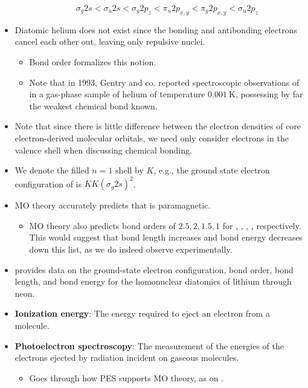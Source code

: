 \documentclass[../notes.tex]{subfiles}
\begin{document}
\begin{itemize}
\begin{itemize}
        \begin{equation*}
            \sigma_g2s < \sigma_u2s
            < \sigma_g2p_z
            < \pi_u2p_{x,y}
            < \pi_g2p_{x,y}
            < \sigma_u2p_z
        \end{equation*}
    \end{itemize}
    \item Diatomic helium does not exist since the bonding and antibonding electrons cancel each other out, leaving only repulsive nuclei.
    \begin{itemize}
        \item Bond order formalizes this notion.
        \item Note that in 1993, Gentry and co. reported spectroscopic observations of  in a gas-phase sample of helium of temperature $\SI{0.001}{\kelvin}$, possessing by far the weakest chemical bond known.
    \end{itemize}
    \item Note that since there is little difference between the electron densities of core electron-derived molecular orbitals, we need only consider electrons in the valence shell when discussing chemical bonding.
    \item We denote the filled $n=1$ shell by $K$, e.g., the ground state electron configuration of  is $KK(\sigma_g2s)^2$.
    \item MO theory accurately predicts that  is paramagnetic.
    \begin{itemize}
        \item MO theory also predicts bond orders of $2.5,2,1.5,1$ for , , , , respectively. This would suggest that bond length increases and bond energy decreases down this list, as we do indeed observe experimentally.
    \end{itemize}
    \item \textcite{bib:McQuarrieSimon} provides data on the ground-state electron configuration, bond order, bond length, and bond energy for the homonuclear diatomics of lithium through neon.
    \item \textbf{Ionization energy}: The energy required to eject an electron from a molecule.
    \item \textbf{Photoelectron spectroscopy}: The measurement of the energies of the electrons ejected by radiation incident on gaseous molecules.
    \begin{itemize}
        \item Goes through how PES supports MO theory, as on \textcite[56]{bib:IChemNotes}.

\end{itemize}
\end{itemize}
\end{document}
